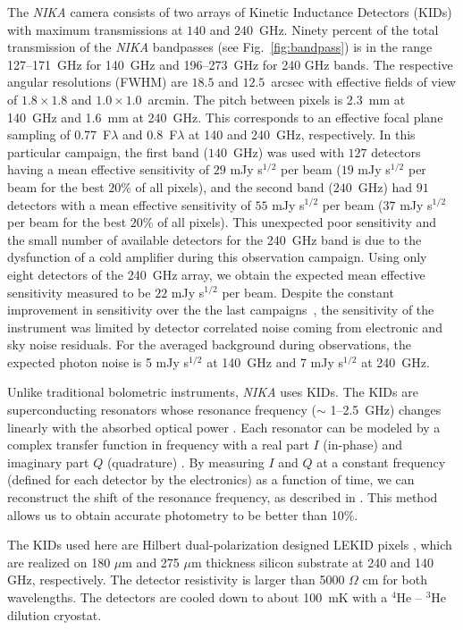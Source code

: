 The {\it NIKA} camera consists of two arrays of Kinetic Inductance Detectors (KIDs) with maximum transmissions at $140$ and $240$~GHz. Ninety percent of the total transmission of the {\it NIKA} bandpasses (see Fig.~\ref{fig:bandpass}) is in the range 127--171~GHz for 140~GHz and 196--273~GHz for 240 GHz bands. The respective angular resolutions (FWHM) are $18.5$ and $12.5$~arcsec with effective fields of view of $1.8 \times 1.8$ and $1.0 \times 1.0$~arcmin. The pitch between pixels is 2.3~mm at 140~GHz and 1.6~mm at 240~GHz. This corresponds to an effective focal plane sampling of 0.77~F$\lambda$ and 0.8~F$\lambda$ at 140 and 240~GHz, respectively. In this particular campaign, the first band ($140$~GHz) was used with $127$ detectors having a mean effective sensitivity of $29$ mJy s$^{1/2}$ per beam ($19$ mJy s$^{1/2}$ per beam for the best $20$\% of all pixels), and the second band ($240$~GHz) had $91$ detectors with a mean effective sensitivity of $55$ mJy s$^{1/2}$ per beam ($37$ mJy s$^{1/2}$ per beam for the best $20$\% of all pixels). This unexpected poor sensitivity and the small number of available detectors for the 240~GHz band is due to the dysfunction of a cold amplifier during this observation campaign. Using only eight detectors of the 240~GHz array, we obtain the expected mean effective sensitivity measured to be $22$ mJy s$^{1/2}$ per beam. Despite the constant improvement in sensitivity over the the last campaigns~\citep{NIKA_2010,NIKA_2011,RFdIdQ}, the sensitivity of the instrument was limited by detector correlated noise coming from electronic and sky noise residuals. For the averaged background during observations, the expected photon noise is 5 mJy s$^{1/2}$ at 140~GHz and 7 mJy s$^{1/2}$ at 240~GHz.

Unlike traditional bolometric instruments, {\it NIKA} uses KIDs. The KIDs are superconducting resonators whose resonance frequency ($\sim$ 1--2.5~GHz) changes linearly with the absorbed optical power \citep[see for example][]{swenson_2010}. Each resonator can be modeled by a complex transfer function in frequency with a real part $I$ (in-phase) and imaginary part $Q$ (quadrature) \citep{grabovskij_2008}. By measuring $I$ and $Q$ at a constant frequency (defined for each detector by the electronics) as a function of time, we can reconstruct the shift of the resonance frequency, as described in \citet{RFdIdQ}. This method allows us to obtain accurate photometry to be better than 10\%.

The KIDs used here are Hilbert dual-polarization designed LEKID pixels \citep[Lumped Element KID;][]{doyle_2008, roesch_2012}, which are realized on 180 $\mu$m and 275 $\mu$m thickness silicon substrate at 240 and 140 GHz, respectively. The detector resistivity is larger than 5000 $\Omega$ cm for both wavelengths. The detectors are cooled down to about 100~mK with a $^4\mathrm{He}$ -- $^3\mathrm{He}$ dilution cryostat. 

